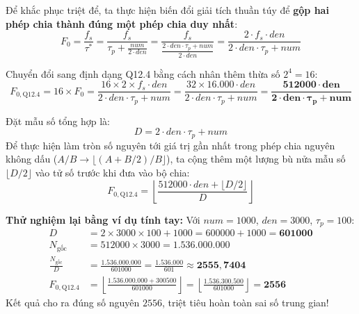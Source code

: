 Để khắc phục triệt để, ta thực hiện biến đổi giải tích thuần túy để \textbf{gộp hai phép chia thành đúng một phép chia duy nhất}:
\begin{equation}
F_0 = \frac{f_s}{\tau^*} = \frac{f_s}{\tau_p + \frac{num}{2 \cdot den}} = \frac{f_s}{\frac{2 \cdot den \cdot \tau_p + num}{2 \cdot den}} = \frac{2 \cdot f_s \cdot den}{2 \cdot den \cdot \tau_p + num}
\end{equation}

Chuyển đổi sang định dạng Q12.4 bằng cách nhân thêm thừa số $2^4 = 16$:
\begin{equation}
F_{0, \text{Q12.4}} = 16 \times F_0 = \frac{16 \times 2 \times f_s \cdot den}{2 \cdot den \cdot \tau_p + num} = \frac{32 \times 16.000 \cdot den}{2 \cdot den \cdot \tau_p + num} = \frac{\mathbf{512000 \cdot den}}{\mathbf{2 \cdot den \cdot \tau_p + num}}
\label{eq:ch09_single_div_exact}
\end{equation}

Đặt mẫu số tổng hợp là:
\begin{equation}
D = 2 \cdot den \cdot \tau_p + num
\end{equation}
Để thực hiện làm tròn số nguyên tới giá trị gần nhất trong phép chia nguyên không dấu ($A / B \to \lfloor (A + B/2) / B \rfloor$), ta cộng thêm một lượng bù nửa mẫu số $\lfloor D / 2 \rfloor$ vào tử số trước khi đưa vào bộ chia:
\begin{equation}
F_{0, \text{Q12.4}} = \left\lfloor \frac{512000 \cdot den + \lfloor D/2 \rfloor}{D} \right\rfloor
\label{eq:ch09_round_f0}
\end{equation}

\textbf{Thử nghiệm lại bằng ví dụ tính tay:}
Với $num = 1000$, $den = 3000$, $\tau_p = 100$:
\begin{align}
D &= 2 \times 3000 \times 100 + 1000 = 600000 + 1000 = \mathbf{601000} \\
N_{\text{gốc}} &= 512000 \times 3000 = \mathbf{1.536.000.000} \\
\frac{N_{\text{gốc}}}{D} &= \frac{1.536.000.000}{601000} = \frac{1.536.000}{601} \approx \mathbf{2555{,}7404} \\
F_{0, \text{Q12.4}} &= \left\lfloor \frac{1.536.000.000 + 300500}{601000} \right\rfloor = \left\lfloor \frac{1.536.300.500}{601000} \right\rfloor = \mathbf{2556}
\end{align}
Kết quả cho ra đúng số nguyên $2556$, triệt tiêu hoàn toàn sai số trung gian!

